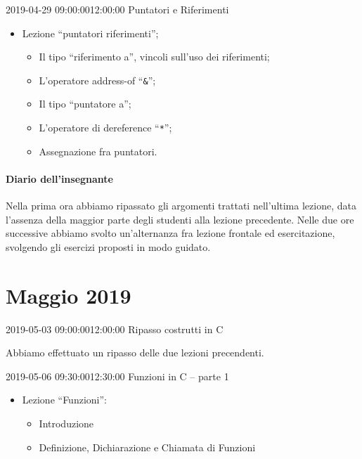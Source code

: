 \documentclass[twoside, symmetric]{tufte-book}
\begin{document}
\begin{lezione}
	{2019-04-29}
	{09:00:00}{12:00:00}
	{Puntatori e Riferimenti}

\begin{itemize}
	\item Lezione ``puntatori riferimenti'';
	\begin{itemize}
		\item Il tipo ``riferimento a'', vincoli sull'uso dei riferimenti;
		\item L'operatore address-of ``\texttt{\&}'';
		\item Il tipo ``puntatore a'';
		\item L'operatore di dereference ``\texttt{*}'';
		\item Assegnazione fra puntatori.
	\end{itemize}
\end{itemize}

\paragraph{Diario dell'insegnante}
Nella prima ora abbiamo ripassato gli argomenti trattati nell'ultima lezione, data l'assenza della maggior parte degli studenti alla lezione precedente.
Nelle due ore successive abbiamo svolto un'alternanza fra lezione frontale ed esercitazione, svolgendo gli esercizi proposti in modo guidato.

%

\end{lezione}

\clearpage
\section*{Maggio 2019}

\begin{lezione}
	{2019-05-03}
	{09:00:00}{12:00:00}
	{Ripasso costrutti in C}

Abbiamo effettuato un ripasso delle due lezioni precendenti.

\end{lezione}

\begin{lezione}
	{2019-05-06}
	{09:30:00}{12:30:00}
	{Funzioni in C -- parte 1}

	\begin{itemize}
		\item Lezione ``Funzioni'':
		\begin{itemize}
			\item Introduzione
			\item Definizione, Dichiarazione e Chiamata di Funzioni
		\end{itemize}
	\end{itemize}

\end{lezione}
\end{document}
